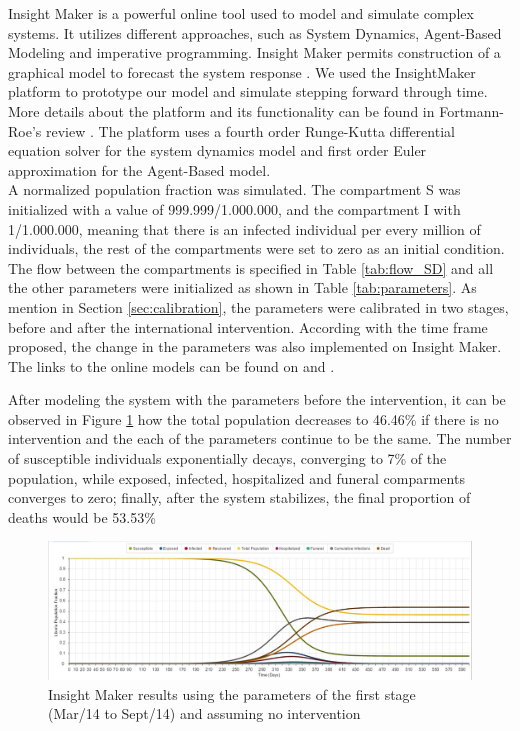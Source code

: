  Insight Maker is a powerful online tool used to model and simulate complex systems. It utilizes different approaches, such as System Dynamics, Agent-Based Modeling and imperative programming. Insight Maker permits  construction of a graphical model to forecast the system response \cite{FortmannRoe}. We used the InsightMaker platform to prototype our model and simulate stepping forward through time. More details about the platform and its functionality can be found in Fortmann-Roe's review \cite{FortmannRoe}. The platform uses a fourth order Runge-Kutta differential equation solver for the system dynamics model and  first order Euler approximation for the Agent-Based model.\\

\noindent A normalized population fraction was simulated. The compartment S was initialized with a value of 999.999/1.000.000, and the compartment I with 1/1.000.000, meaning that there is an infected individual per every million of individuals, the rest of the compartments were set to zero as an initial condition. The flow between the compartments is specified in Table \ref{tab:flow_SD} and all the other parameters were initialized as shown in Table \ref{tab:parameters}.  As mention in Section \ref{sec:calibration}, the parameters were calibrated in two stages, before and after the international intervention. According with the time frame proposed, the change in the parameters was also implemented on Insight Maker. The links to the online models can be found on \cite{IM_AI} and  \cite{IM_BI}.  




%
\noindent After modeling the system with the parameters before the intervention, it can be observed in Figure \ref{fig:LB_IM_NoIn} how the total population decreases to 46.46\%  if there is no intervention and the each of the parameters continue to be the same. The number of susceptible individuals exponentially decays, converging to 7\% of the population, while exposed, infected, hospitalized and funeral comparments converges to zero; finally, after the system stabilizes, the final proportion of deaths would be 53.53\% 

\begin{figure}[!h]
  \centering
  \includegraphics[width=1\textwidth]{LB_NoInt_SD_IM}
  \caption{ Insight Maker results using the parameters of the first stage (Mar/14 to Sept/14) and assuming no intervention}
\label{fig:LB_IM_NoIn} 
\end{figure}

